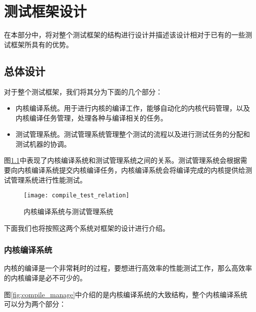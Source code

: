 

\chapter{测试框架设计}

在本部分中，将对整个测试框架的结构进行设计并描述该设计相对于已有的一些测试框架所具有的优势。

\section{总体设计}
对于整个测试框架，我们将其分为下面的几个部分：
\begin{itemize}
\item 内核编译系统。用于进行内核的编译工作，能够自动化的内核代码管理，以及内核编译任务管理，处理各种与编译相关的任务。
\item 测试管理系统。测试管理系统管理整个测试的流程以及进行测试任务的分配和测试机器的协调。
\end{itemize}

图\ref{fig:compile_test_relation}中表现了内核编译系统和测试管理系统之间的关系。测试管理系统会根据需要向内核编译系统提交内核编译任务，内核编译系统会将编译完成的内核提供给测试管理系统进行性能测试。

\begin{figure}[H]
\centering
\texttt{[image: compile\_test\_relation]}
\caption{内核编译系统与测试管理系统}
\label{fig:compile_test_relation}
\end{figure}

下面我们也将按照这两个系统对框架的设计进行介绍。

\subsection{内核编译系统}
内核的编译是一个非常耗时的过程，要想进行高效率的性能测试工作，那么高效率的内核编译是必不可少的。

图\ref{fig:compile_manage}中介绍的是内核编译系统的大致结构，整个内核编译系统可以分为两个部分：

